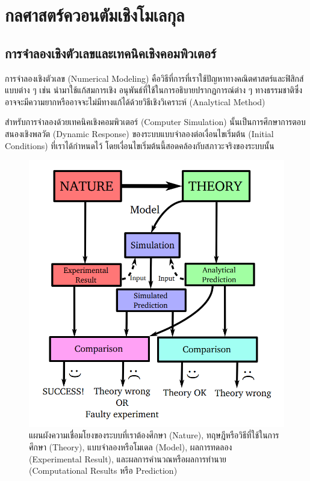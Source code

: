 

\chapter{กลศาสตร์ควอนตัมเชิงโมเลกุล}
\label{ch:mol_qm}

\section{การจำลองเชิงตัวเลขและเทคนิคเชิงคอมพิวเตอร์}

การจำลองเชิงตัวเลข (Numerical Modeling) คือวิธีที่การที่เราใช้ปัญหาทางคณิตศาสตร์และฟิสิกส์แบบต่าง ๆ เช่น นำมาใช้แก้สมการเชิง%
อนุพันธ์ที่ใช้ในการอธิบายปรากฏการณ์ต่าง ๆ ทางธรรมชาติซึ่งอาจจะมีความยากหรืออาจจะไม่มีทางแก้ได้ด้วยวิธีเชิงวิเคราะห์ (Analytical Method)

สำหรับการจำลองด้วยเทคนิคเชิงคอมพิวเตอร์ (Computer Simulation) นั้นเป็นการศึกษาการตอบสนองเชิงพลวัต (Dynamic Response) 
ของระบบแบบจำลองต่อเงื่อนไขเริ่มต้น (Initial Conditions) ที่เราได้กำหนดไว้ โดยเงื่อนไขเริ่มต้นนี้สอดคล้องกับสภาวะจริงของระบบนั้น

\begin{figure}[htbp]
    \centering
    \includegraphics[width=0.8\linewidth]{fig/simulation-modeling-graph.png}
    \caption{แผนผังความเชื่อมโยงของระบบที่เราต้องศึกษา (Nature), ทฤษฎีหรือวิธีที่ใช้ในการศึกษา (Theory), แบบจำลองหรือโมเดล 
    (Model), ผลการทดลอง (Experimental Result), และผลการคำนวณหรือผลการทำนาย (Computational Results หรือ Prediction)}
    \label{fig:sim_model_graph}
\end{figure}

